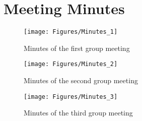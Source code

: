 

\section{Meeting Minutes} \label{Section:Minutes}

	\begin{figure}[ht!]
		\centering
		\texttt{[image: Figures/Minutes\_1]}
		\caption[Minutes I]{Minutes of the first group meeting}
		\label {fig:minutes:one}
	\end{figure}
	
		\begin{figure}[ht!]
		\centering
		\texttt{[image: Figures/Minutes\_2]}
		\caption[Minutes II]{Minutes of the second group meeting}
		\label {fig:minutes:two}
	\end{figure}
	
		\begin{figure}[ht!]
		\centering
		\texttt{[image: Figures/Minutes\_3]}
		\caption[Minutes III]{Minutes of the third group meeting}
		\label {fig:minutes:three}
	\end{figure}